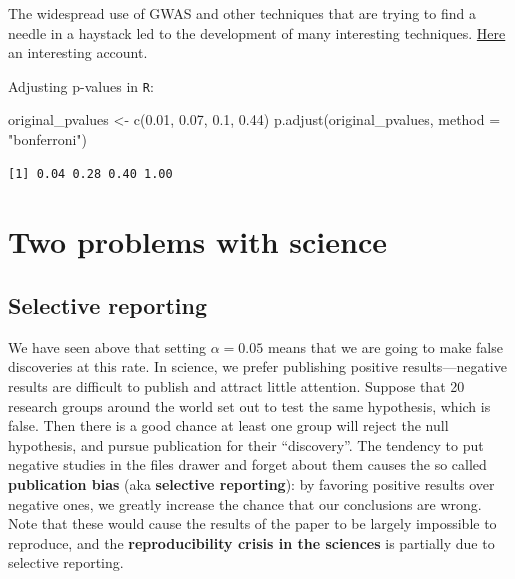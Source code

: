 \documentclass[
  letterpaper,
  DIV=11,
  numbers=noendperiod]{scrreprt}
\newenvironment{Shaded}{\begin{snugshade}}{\end{snugshade}}
\newcommand{\AttributeTok}[1]{\textcolor[rgb]{0.40,0.45,0.13}{#1}}
\newcommand{\FloatTok}[1]{\textcolor[rgb]{0.68,0.00,0.00}{#1}}
\newcommand{\FunctionTok}[1]{\textcolor[rgb]{0.28,0.35,0.67}{#1}}
\newcommand{\NormalTok}[1]{\textcolor[rgb]{0.00,0.23,0.31}{#1}}
\newcommand{\OtherTok}[1]{\textcolor[rgb]{0.00,0.23,0.31}{#1}}
\newcommand{\StringTok}[1]{\textcolor[rgb]{0.13,0.47,0.30}{#1}}
\begin{document}
The widespread use of GWAS and other techniques that are trying to find
a needle in a haystack led to the development of many interesting
techniques.
\href{http://lybird300.github.io/2015/10/19/multiple-test-correction.html}{Here}
an interesting account.

Adjusting p-values in \texttt{R}:

\begin{Shaded}
\begin{Highlighting}[]
\NormalTok{original\_pvalues }\OtherTok{\textless{}{-}} \FunctionTok{c}\NormalTok{(}\FloatTok{0.01}\NormalTok{, }\FloatTok{0.07}\NormalTok{, }\FloatTok{0.1}\NormalTok{, }\FloatTok{0.44}\NormalTok{)}
\FunctionTok{p.adjust}\NormalTok{(original\_pvalues, }\AttributeTok{method =} \StringTok{"bonferroni"}\NormalTok{)}
\end{Highlighting}
\end{Shaded}

\begin{verbatim}
[1] 0.04 0.28 0.40 1.00
\end{verbatim}

\hypertarget{two-problems-with-science}{%
\section{Two problems with science}\label{two-problems-with-science}}

\hypertarget{selective-reporting}{%
\subsection{Selective reporting}\label{selective-reporting}}

We have seen above that setting \(\alpha = 0.05\) means that we are
going to make false discoveries at this rate. In science, we prefer
publishing positive results---negative results are difficult to publish
and attract little attention. Suppose that 20 research groups around the
world set out to test the same hypothesis, which is false. Then there is
a good chance at least one group will reject the null hypothesis, and
pursue publication for their ``discovery''. The tendency to put negative
studies in the files drawer and forget about them causes the so called
\textbf{publication bias} (aka \textbf{selective reporting}): by
favoring positive results over negative ones, we greatly increase the
chance that our conclusions are wrong. Note that these would cause the
results of the paper to be largely impossible to reproduce, and the
\textbf{reproducibility crisis in the sciences} is partially due to
selective reporting.
\end{document}
